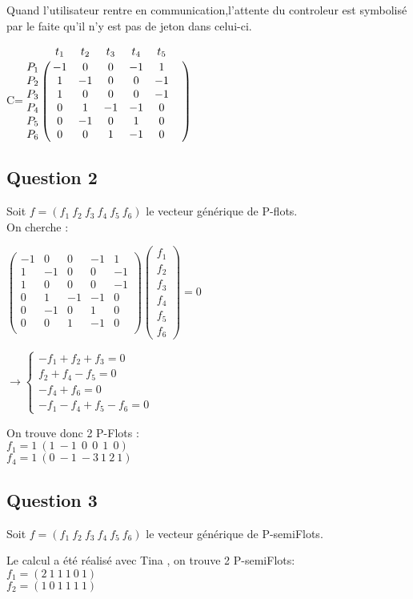 Quand l'utilisateur rentre en communication,l'attente du controleur est symbolisé par le faite qu'il n'y est pas de jeton dans celui-ci.

\begin{center}

{\Huge C}\qquad =\qquad $\bordermatrix{
&t_1&t_2&t_3&t_4&t_5&\cr
P_1&-1&0&0&-1&1\cr
P_2&1&-1&0&0&-1\cr
P_3&1&0&0&0&-1\cr
P_4&0&1&-1&-1&0\cr
P_5&0&-1&0&1&0\cr
P_6&0&0&1&-1&0\cr
}$

\end{center}

\subsection{Question 2}
Soit $f=(f_1\ f_2\ f_3\ f_4\ f_5\ f_6)$ le vecteur générique de P-flots.\\
On cherche : 
\begin{center}
$\begin{pmatrix}
-1 & 0 & 0 & -1 & 1\\
 1 & -1 & 0 & 0 & -1\\
 1 & 0 & 0 & 0 & -1\\
 0 & 1 & -1 & -1 & 0\\
 0 & -1 & 0 & 1 & 0\\ 
 0 & 0 & 1 & -1 & 0\\
\end{pmatrix}
\begin{pmatrix}
f_1\\
f_2\\ 
f_3\\ 
f_4\\ 
f_5\\ 
f_6
\end{pmatrix}
=0
$

\vspace{0.5cm}

$\rightarrow 
\begin{cases}
-f_1 + f_2 + f_3 = 0\\
f_2 + f_4 - f_5  = 0\\
-f_4 + f_6  = 0\\
-f_1 - f_4 + f_5 - f_6 = 0
\end{cases}$

\vspace{0.5cm}
On trouve donc 2 P-Flots :\\
$
f_1 = 1 \ (1 \ -1 \ \ 0 \ \ 0 \ \ 1 \ \ 0)
$
\\
$
f_4 = 1 \ (0 \ -1 \ -3 \ 1 \ 2 \ 1)
$

\end{center}
\subsection{Question 3}
Soit $f=(f_1\ f_2\ f_3\ f_4\ f_5\ f_6)$ le vecteur générique de P-semiFlots.\\
\begin{center}
Le calcul a été réalisé avec Tina , on trouve 2 P-semiFlots: \\
$f_1 = (2\ 1\ 1\ 1\ 0\ 1)$\\
$f_2 = (1\ 0\ 1\ 1\ 1\ 1)$
\end{center}